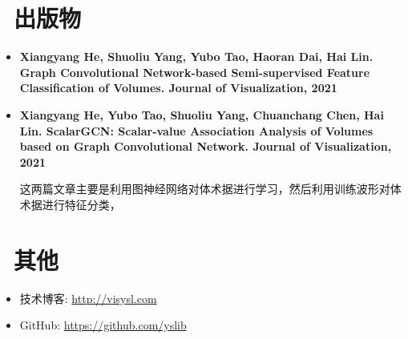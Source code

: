 \documentclass{resume}
\begin{document}
\section{\faUsers\ 出版物}

\begin{itemize}

\item \textbf{Xiangyang He, Shuoliu Yang, Yubo Tao, Haoran Dai, Hai Lin. Graph Convolutional Network-based Semi-supervised Feature Classification of Volumes. Journal of Visualization, 2021}
\item \textbf{Xiangyang He, Yubo Tao, Shuoliu Yang, Chuanchang Chen, Hai Lin. ScalarGCN: Scalar-value Association Analysis of Volumes based on Graph Convolutional Network. Journal of Visualization, 2021}

这两篇文章主要是利用图神经网络对体术据进行学习，然后利用训练波形对体术据进行特征分类，

\end{itemize}

\section{\faInfo\ 其他}
\begin{itemize}[parsep=0.5ex]
  \item 技术博客: \url{http://visysl.com}
  \item GitHub: \url{https://github.com/yslib}
\end{itemize}
\end{document}
